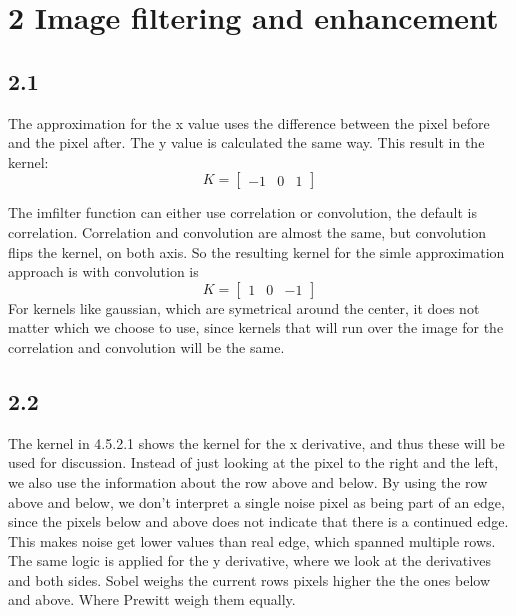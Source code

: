 \documentclass[11pt]{report}
\begin{document}
\section{2 Image filtering and enhancement}

\subsection{2.1}
The approximation for the x value uses the difference between the pixel before and the pixel after. The y value is calculated the same way. This result in the kernel:
$$
K =
\begin{bmatrix}
  -1 & 0 & 1
 \end{bmatrix}
$$

The imfilter function can either use correlation or convolution, the default is correlation. Correlation and convolution are almost the same, but convolution flips the kernel, on both axis. So the resulting kernel for the simle approximation approach is with convolution is
$$
K =
\begin{bmatrix}
  1 & 0 & -1
 \end{bmatrix}
$$
For kernels like gaussian, which are symetrical around the center, it does not matter which we choose to use, since kernels that will run over the image for the correlation and convolution will be the same.
\subsection{2.2}

The kernel in 4.5.2.1 shows the kernel for the x derivative, and thus these will be used for discussion. Instead of just looking at the pixel to the right and the left, we also use the information about the row above and below. By using the row above and below, we don't interpret a single noise pixel as being part of an edge, since the pixels below and above does not indicate that there is a continued edge. This makes noise get lower values than real edge, which spanned multiple rows. The same logic is applied for the y derivative, where we look at the derivatives and both sides. Sobel weighs the current rows pixels higher the the ones below and above. Where Prewitt weigh them equally.
\end{document}
